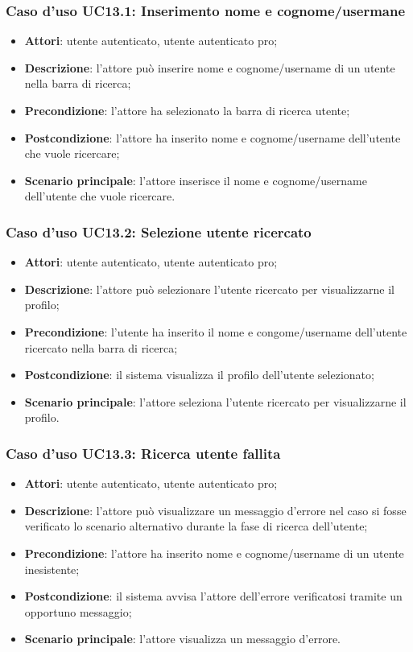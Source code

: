 \subsubsection{Caso d'uso UC13.1: Inserimento nome e cognome/usermane}

\begin{itemize}
	\item \textbf{Attori}: utente autenticato, utente autenticato pro;
	\item \textbf{Descrizione}: l'attore può inserire nome e cognome/username di un utente nella barra di ricerca;
	\item \textbf{Precondizione}: l'attore ha selezionato la barra di ricerca utente;
	\item \textbf{Postcondizione}: l'attore ha inserito nome e cognome/username dell'utente che vuole ricercare;
	\item \textbf{Scenario principale}: l'attore inserisce il nome e cognome/username dell'utente che vuole ricercare.
\end{itemize}

\subsubsection{Caso d'uso UC13.2: Selezione utente ricercato}

\begin{itemize}
	\item \textbf{Attori}: utente autenticato, utente autenticato pro;
	\item \textbf{Descrizione}: l'attore può selezionare l'utente ricercato per visualizzarne il profilo;
	\item \textbf{Precondizione}: l'utente ha inserito il nome e congome/username dell'utente ricercato nella barra di ricerca;
	\item \textbf{Postcondizione}: il sistema visualizza il profilo dell'utente selezionato;
	\item \textbf{Scenario principale}: l'attore seleziona l'utente ricercato per visualizzarne il profilo.
\end{itemize}

\subsubsection{Caso d'uso UC13.3: Ricerca utente fallita}

\begin{itemize}
	\item \textbf{Attori}: utente autenticato, utente autenticato pro;
	\item \textbf{Descrizione}: l'attore può visualizzare un messaggio d'errore nel caso si fosse verificato lo scenario alternativo durante la fase di ricerca dell'utente;
	\item \textbf{Precondizione}: l'attore ha inserito nome e cognome/username di un utente inesistente;
	\item \textbf{Postcondizione}: il sistema avvisa l'attore dell'errore verificatosi tramite un opportuno messaggio;
\item\textbf{Scenario principale}: l'attore visualizza un messaggio d'errore.
\end{itemize}
